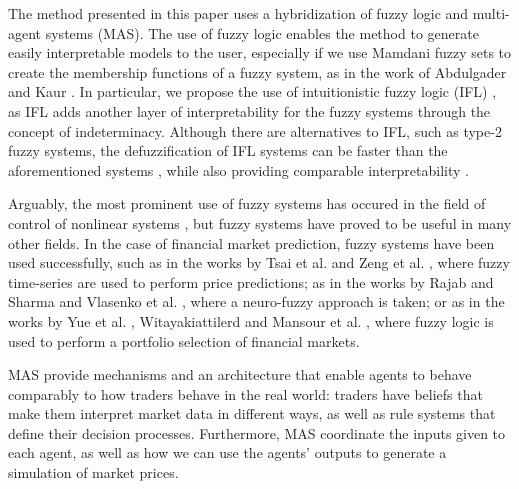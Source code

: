 \documentclass{ieeeaccess}
\begin{document}
The method presented in this paper uses a hybridization of fuzzy logic
and multi-agent systems (MAS). The use of fuzzy logic enables
the method to generate easily interpretable models to the user,
especially if we use Mamdani fuzzy sets \cite{Mamdani1975} 
to create the membership functions of a fuzzy system, as in the
work of Abdulgader and Kaur \cite{Abdulgader2019}. 
In particular, we propose the use of intuitionistic fuzzy logic (IFL)
\cite{Atanassov1986} \cite{Atanassov2003}, as IFL adds another layer
of interpretability for the fuzzy systems through the concept of
indeterminacy. Although there are alternatives to IFL, such as type-2
fuzzy systems, the defuzzification of IFL systems can be faster than
the aforementioned systems \cite{Hernandez-Aguila2017-2}, while also
providing comparable interpretability \cite{Hernandez-Aguila2016} \cite{castillo2019comments}.

Arguably, the most prominent use of fuzzy systems has occured in the
field of control of nonlinear systems \cite{sun2020event}
\cite{sun2020fuzzy}, but fuzzy systems have proved to be useful in
many other fields. In the case of financial market prediction, fuzzy
systems have been used successfully,
such as in the works by Tsai et al. \cite{Tsai2019} and Zeng et
al. \cite{Zeng2019}, where fuzzy time-series are used to perform price
predictions; as in the works by Rajab and Sharma \cite{Rajab2019} and
Vlasenko et al. \cite{Vlasenko2019}, where a neuro-fuzzy approach is
taken; or as in the works by Yue et al. \cite{Yue2019},
Witayakiattilerd \cite{Witayakiattilerd2019} and Mansour et
al. \cite{Mansour2019}, where fuzzy logic is used to perform a
portfolio selection of financial markets.

MAS provide mechanisms and an architecture that enable agents to
behave comparably to how traders behave in the real world: traders have
beliefs that make them interpret market data in different ways, as
well as rule systems that define their decision
processes. Furthermore, MAS coordinate the inputs given to each agent,
as well as how we can use the agents' outputs to generate a simulation
of market prices.
\end{document}
